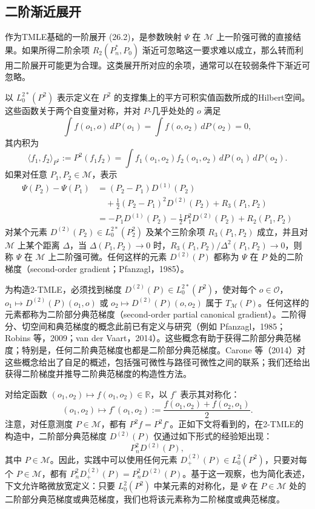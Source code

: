 \subsection{二阶渐近展开}

作为TMLE基础的一阶展开 (26.2)，是参数映射 $\Psi$ 在 $\mathcal M$ 上一阶强可微的直接结果。如果所得二阶余项 $R_2(P_n^*,P_0)$ 渐近可忽略这一要求难以成立，那么转而利用二阶展开可能更为合理。这类展开所对应的余项，通常可以在较弱条件下渐近可忽略。

以 $L_0^{2*}(P^2)$ 表示定义在 $P^2$ 的支撑集上的平方可积实值函数所成的Hilbert空间。这些函数关于两个自变量对称，并对 $P$-几乎处处的 $o$ 满足
\[
\int f(o_1,o)\,dP(o_1)=\int f(o,o_2)\,dP(o_2)=0,
\]
其内积为
\[
\langle f_1,f_2\rangle_{P^2}:=P^2(f_1f_2)
=\int f_1(o_1,o_2)f_2(o_1,o_2)\,dP(o_1)\,dP(o_2).
\]
如果对任意 $P_1,P_2\in\mathcal M$，表示
\begin{equation}
\begin{aligned}
\Psi(P_2)-\Psi(P_1)
 &= (P_2-P_1)D^{(1)}(P_2)\\
 &\quad+\frac12(P_2-P_1)^2D^{(2)}(P_2)+R_3(P_1,P_2)\\
 &= -P_1D^{(1)}(P_2)-\frac12P_1^2D^{(2)}(P_2)+R_2(P_1,P_2)
\end{aligned}
\tag{26.4}
\end{equation}
对某个元素 $D^{(2)}(P_2)\in L_0^{2*}(P_2^2)$ 及某个三阶余项 $R_3(P_1,P_2)$ 成立，并且对 $\mathcal M$ 上某个距离 $\Delta$，当 $\Delta(P_1,P_2)\to0$ 时，$R_3(P_1,P_2)/\Delta^2(P_1,P_2)\to0$，则称 $\Psi$ 在 $\mathcal M$ 上二阶强可微。任何这样的元素 $D^{(2)}(P)$ 都称为 $\Psi$ 在 $P$ 处的二阶梯度（second-order gradient；Pfanzagl，1985）。

为构造2-TMLE，必须找到梯度 $D^{(2)}(P)\in L_0^{2*}(P^2)$，使对每个 $o\in\mathcal O$，$o_1\mapsto D^{(2)}(P)(o_1,o)$ 或 $o_2\mapsto D^{(2)}(P)(o,o_2)$ 属于 $T_{\mathcal M}(P)$。任何这样的元素都称为二阶部分典范梯度（second-order partial canonical gradient）。二阶得分、切空间和典范梯度的概念此前已有定义与研究（例如 Pfanzagl，1985；Robins 等，2009；van der Vaart，2014）。这些概念有助于获得二阶部分典范梯度；特别是，任何二阶典范梯度也都是二阶部分典范梯度。Carone 等（2014）对这些概念给出了自足的概述，包括强可微性与路径可微性之间的联系；我们还给出获得二阶梯度并推导二阶典范梯度的构造性方法。

对给定函数 $(o_1,o_2)\mapsto f(o_1,o_2)\in\mathbb R$，以 $f^\circ$ 表示其对称化：
\[
(o_1,o_2)\mapsto f^\circ(o_1,o_2):=\frac{f(o_1,o_2)+f(o_2,o_1)}2.
\]
注意，对任意测度 $P\in\mathcal M$，都有 $P^2f=P^2f^\circ$。正如下文将看到的，在2-TMLE的构造中，二阶部分典范梯度 $D^{(2)}(P)$ 仅通过如下形式的经验矩出现：
\[
P_n^2D^{(2)}(P),
\]
其中 $P\in\mathcal M$。因此，实践中可以使用任何元素 $D_+^{(2)}(P)\in L_0^2(P^2)$，只要对每个 $P\in\mathcal M$，都有 $P_n^2D_+^{(2)}(P)=P_n^2D^{(2)}(P)$。基于这一观察，也为简化表述，下文允许略微放宽定义：只要 $L_0^2(P^2)$ 中某元素的对称化，是 $\Psi$ 在 $P\in\mathcal M$ 处的二阶部分典范梯度或典范梯度，我们也将该元素称为二阶梯度或典范梯度。

